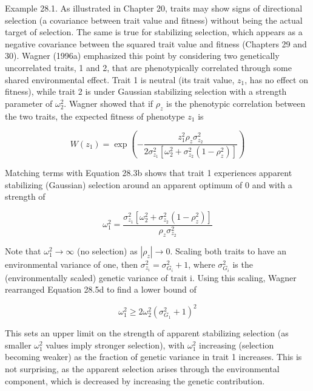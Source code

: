 \documentclass{article}
\begin{document}
Example 28.1. As illustrated in Chapter 20, traits may show signs of directional selection (a covariance between trait value and fitness) without being the actual target of selection. The same is true for stabilizing selection, which appears as a negative covariance between the squared trait value and fitness (Chapters 29 and 30). Wagner (1996a) emphasized this point by considering two genetically uncorrelated traits, 1 and 2, that are phenotypically correlated through some shared environmental effect. Trait 1 is neutral (its trait value,  $ z_1 $, has no effect on fitness), while trait 2 is under Gaussian stabilizing selection with a strength parameter of  $ \omega_2^2 $. Wagner showed that if  $ \rho_z $ is the phenotypic correlation between the two traits, the expected fitness of phenotype  $ z_1 $ is

\begin{equation}
W(z_{1})=\exp\left(-\frac{z_{1}^{2}\rho_{z}\sigma_{z_{2}}^{2}}{2\sigma_{z_{1}}^{2}[\omega_{2}^{2}+\sigma_{z_{2}}^{2}(1-\rho_{z}^{2})]}\right)
\tag{28.5a}
\label{eq:28_5a}
\end{equation}

Matching terms with Equation 28.3b shows that trait 1 experiences apparent stabilizing (Gaussian) selection around an apparent optimum of 0 and with a strength of

\begin{equation}
\omega_{1}^{2}=\frac{\sigma_{z_{1}}^{2}[\omega_{2}^{2}+\sigma_{z_{2}}^{2}(1-\rho_{z}^{2})]}{\rho_{z}\sigma_{z_{2}}^{2}}
\tag{28.5b}
\label{eq:28_5b}
\end{equation}

Note that  $ \omega_1^2 \to \infty $ (no selection) as  $ |\rho_z| \to 0 $. Scaling both traits to have an environmental variance of one, then  $ \sigma_{z_i}^2 = \sigma_{G_i}^2 + 1 $, where  $ \sigma_{G_i}^2 $ is the (environmentally scaled) genetic variance of trait i. Using this scaling, Wagner rearranged Equation 28.5d to find a lower bound of

\begin{equation}
\omega_{1}^{2}\geq2\omega_{2}^{2}(\sigma_{G_{1}}^{2}+1)^{2}
\tag{28.5c}
\label{eq:28_5c}
\end{equation}

This sets an upper limit on the strength of apparent stabilizing selection (as smaller  $ \omega_1^2 $ values imply stronger selection), with  $ \omega_1^2 $ increasing (selection becoming weaker) as the fraction of genetic variance in trait 1 increases. This is not surprising, as the apparent selection arises through the environmental component, which is decreased by increasing the genetic contribution.
\end{document}
